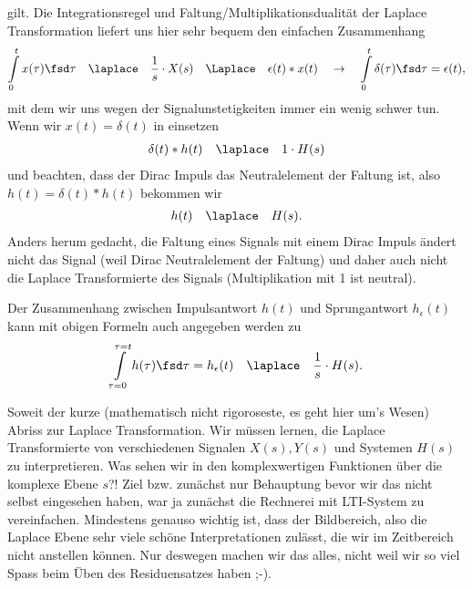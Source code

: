 gilt.
Die Integrationsregel und Faltung/Multiplikationsdualität der Laplace Transformation liefert uns hier sehr bequem
den einfachen Zusammenhang
\begin{equation}
\int\limits_{0}^{t} x(\tau) \fsd\tau\quad\laplace\quad \frac{1}{s} \cdot X(s)
\quad\Laplace\quad \epsilon(t) \ast x(t)
\quad\rightarrow\quad
\int\limits_{0}^{t} \delta(\tau)\fsd \tau = \epsilon(t),
\end{equation}
mit dem wir uns wegen der Signalunstetigkeiten immer ein wenig schwer tun.
%
Wenn wir $x(t)=\delta(t)$ in  einsetzen
\begin{align}
\delta(t) \ast h(t) \quad\laplace\quad 1 \cdot H(s)
\end{align}
und beachten, dass der Dirac Impuls das Neutralelement der Faltung ist,
also $h(t) = \delta(t) \ast h(t)$ bekommen wir
\begin{align}
h(t) \quad\laplace\quad H(s).
\end{align}
Anders herum gedacht, die Faltung eines Signals mit einem Dirac Impuls
ändert nicht das Signal (weil Dirac Neutralelement der Faltung) und
daher auch nicht die Laplace Transformierte des Signals (Multiplikation mit 1 ist
neutral).

Der Zusammenhang zwischen Impulsantwort $h(t)$ und Sprungantwort $h_\epsilon(t)$
kann mit obigen Formeln auch angegeben werden zu
\begin{align}
\int\limits_{\tau=0}^{\tau=t} h(\tau)\fsd \tau = h_\epsilon(t) \quad\laplace\quad \frac{1}{s} \cdot H(s).
\end{align}

Soweit der kurze (mathematisch nicht rigoroseste, es geht hier um's Wesen)
Abriss zur Laplace Transformation.
Wir müssen lernen, die Laplace Transformierte von verschiedenen
Signalen $X(s), Y(s)$ und Systemen $H(s)$ zu interpretieren. Was sehen wir in den
komplexwertigen Funktionen über die komplexe Ebene $s$?!
Ziel bzw. zunächst nur Behauptung bevor wir das nicht selbst eingesehen haben,
war ja zunächst die Rechnerei mit LTI-System zu vereinfachen.
Mindestens genauso wichtig ist, dass der Bildbereich, also die Laplace Ebene
sehr viele schöne Interpretationen zulässt, die wir im Zeitbereich nicht
anstellen können. Nur deswegen machen wir das alles, nicht weil wir so viel
Spass beim Üben des Residuensatzes haben ;-).














